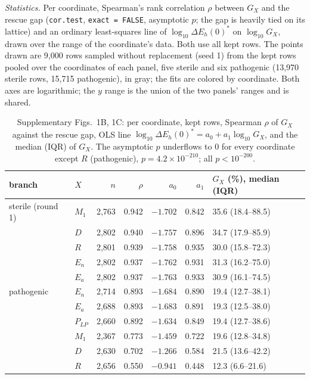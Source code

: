 \documentclass[11pt]{article}
\newcommand{\gap}{\Delta E_h(0)^{*}}
\begin{document}
\emph{Statistics.} Per coordinate, Spearman's rank correlation $\rho$ between $G_X$ and the
rescue gap (\texttt{cor.test}, \texttt{exact = FALSE}, asymptotic $p$; the gap is heavily tied on
its lattice) and an ordinary least-squares line of $\log_{10}\gap$ on $\log_{10}G_X$, drawn
over the range of the coordinate's data. Both use all kept rows. The points drawn are 9{,}000
rows sampled without replacement (seed 1) from the kept rows pooled over the
coordinates of each panel, five sterile and six pathogenic (13{,}970 sterile rows,
15{,}715 pathogenic), in gray; the fits are colored by coordinate.
Both axes are logarithmic; the $y$ range is the union of the two panels' ranges and is shared.
\begin{table}[H]
\centering
\caption{Supplementary Figs.~1B, 1C: per coordinate, kept rows, Spearman $\rho$ of $G_X$ against the rescue
gap, OLS line $\log_{10}\gap = a_0 + a_1\log_{10}G_X$, and the median (IQR) of $G_X$.
The asymptotic $p$ underflows to 0 for every coordinate except $R$ (pathogenic),
$p = 4.2\times10^{-210}$; all $p < 10^{-200}$.}
\label{tab:gainstats}
\small
\begin{tabular}{llrrrrl}
\toprule
branch & $X$ & $n$ & $\rho$ & $a_0$ & $a_1$ & $G_X$ (\%), median (IQR)\\
\midrule
sterile (round 1) & $M_1$ & 2{,}763 & 0.942 & $-1.702$ & 0.842 & 35.6 (18.4--88.5)\\
 & $D$ & 2{,}802 & 0.940 & $-1.757$ & 0.896 & 34.7 (17.9--85.9)\\
 & $R$ & 2{,}801 & 0.939 & $-1.758$ & 0.935 & 30.0 (15.8--72.3)\\
 & $E_n$ & 2{,}802 & 0.937 & $-1.762$ & 0.931 & 31.3 (16.2--75.0)\\
 & $E_a$ & 2{,}802 & 0.937 & $-1.763$ & 0.933 & 30.9 (16.1--74.5)\\
pathogenic & $E_n$ & 2{,}714 & 0.893 & $-1.684$ & 0.890 & 19.4 (12.7--38.1)\\
 & $E_a$ & 2{,}688 & 0.893 & $-1.683$ & 0.891 & 19.3 (12.5--38.0)\\
 & $P_{LP}$ & 2{,}660 & 0.892 & $-1.634$ & 0.849 & 19.4 (12.7--38.6)\\
 & $M_1$ & 2{,}367 & 0.773 & $-1.459$ & 0.722 & 19.6 (12.8--34.8)\\
 & $D$ & 2{,}630 & 0.702 & $-1.266$ & 0.584 & 21.5 (13.6--42.2)\\
 & $R$ & 2{,}656 & 0.550 & $-0.941$ & 0.448 & 12.3 (6.6--21.6)\\
\bottomrule
\end{tabular}
\end{table}
\end{document}
